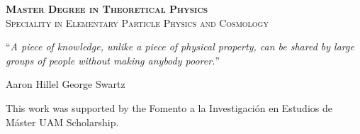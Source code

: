 \documentclass[
11pt, %
oneside, %
english, %
singlespacing, %
headsepline, %
consistentlayout, %
]{MastersDoctoralThesis} %
\begin{document}
\begin{titlepage}
\begin{center}
\vfill

{\scshape \textbf{Master Degree in Theoretical Physics}}\\
{\scshape Speciality in Elementary Particle Physics and Cosmology}\\%

 

\end{center}
\end{titlepage}


\vspace*{0.2\textheight}

\noindent\enquote{\itshape A piece of knowledge, unlike a piece of physical property, can be shared by large groups of people without making anybody poorer.}\bigbreak

\hfill Aaron Hillel George Swartz


\begin{acknowledgements}
	\addchaptertocentry{\acknowledgementname} %
	This work was supported by the Fomento a la Investigación en Estudios de Máster UAM Scholarship.
\end{acknowledgements}


\begin{abstract}
\addchaptertocentry{\abstractname} %

\end{abstract}



\tableofcontents %
\end{document}
